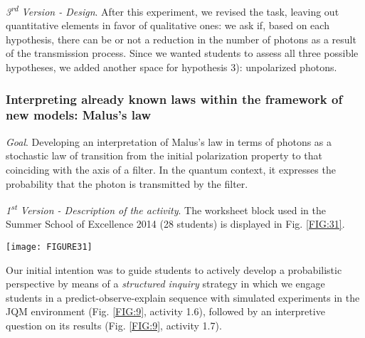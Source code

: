 \documentclass[twocolumn,secnumarabic,amssymb, nobibnotes, aps, prd, nofootinbib]{revtex4-2}
\begin{document}
\emph{3\textsuperscript{rd} Version - Design}. After this experiment, we revised the task, leaving out quantitative elements in favor of qualitative ones: we ask if, based on each hypothesis, there can be or not a reduction in the number of photons as a result of the transmission process. Since we wanted students to assess all three possible hypotheses, we added another space for hypothesis 3): unpolarized photons.

\subsubsection{Interpreting already known laws within the framework of new models: Malus's law} \label{Sec:5.4.1}
\emph{Goal}. Developing an interpretation of Malus's law in terms of photons as a stochastic law of transition from the initial polarization property to that coinciding with the axis of a filter. In the quantum context, it expresses the probability that the photon is transmitted by the filter.

\emph{1\textsuperscript{st} Version - Description of the activity}. The worksheet block used in the Summer School of Excellence 2014 (28 students) is displayed in Fig. \ref{FIG:31}.
\begin{figure*}[!htpb]
       \texttt{[image: FIGURE31]}
    \caption{Worksheet block on the interpretation of Malus's law: 2014 version.}
    \label{FIG:31}
\end{figure*}
Our initial intention was to guide students to actively develop a probabilistic perspective by means of a \emph{structured inquiry} strategy \cite{Llewellyn2012} in which we engage students in a predict-observe-explain sequence \cite{White1992} with simulated experiments in the JQM environment (Fig. \ref{FIG:9}, activity 1.6), followed by an interpretive question on its results (Fig. \ref{FIG:9}, activity 1.7).
\end{document}
